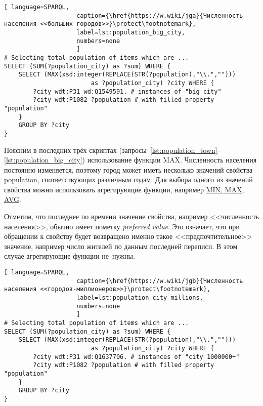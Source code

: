 \vspace{-2pt}
\begin{lstlisting}[ language=SPARQL, 
                    caption={\href{https://w.wiki/jga}{Численность населения <<больших городов>>}\protect\footnotemark},
                    label=lst:population_big_city,
                    numbers=none
                    ]
# Selecting total population of items which are ...
SELECT (SUM(?population_city) as ?sum) WHERE {                    
	SELECT (MAX(xsd:integer(REPLACE(STR(?population),"\\.",""))) 
						as ?population_city) ?city WHERE {
		?city wdt:P31 wd:Q1549591. # instances of "big city"
		?city wdt:P1082 ?population # with filled property "population"
	}
	GROUP BY ?city
}
\end{lstlisting}



\newpage
Поясним в последних трёх скриптах 
(запросы~\ref{lst:population_town}--\ref{lst:population_big_city}) 
использование функции MAX. 
Численность населения постоянно изменяется, 
поэтому город может иметь несколько значений 
свойства \href{https://www.wikidata.org/wiki/Property:P1082}{population}, 
соответствующих различным годам. Для выбора одного из значений свойства можно использовать агрегирующие функции, 
например \href{https://en.wikibooks.org/wiki/SPARQL/Expressions\_and\_Functions\#COUNT,\_MIN,\_MAX,\_AVG\_and\_SUM}{MIN, MAX, AVG}. 

Отметим, что последнее по времени значение свойства, например <<численность населения>>, 
обычно имеет пометку \emph{preferred value}. 
Это означает, что при обращении к свойству будет возвращено именно такое <<предпочтительное>> значение, 
например число жителей по данным последней переписи. 
В этом случае агрегирующие функции не~нужны. 

\begin{lstlisting}[ language=SPARQL, 
                    caption={\href{https://w.wiki/jgb}{Численность населения <<городов-миллионеров>>}\protect\footnotemark},
                    label=lst:population_city_millions,
                    numbers=none
                    ]
# Selecting total population of items which are ...
SELECT (SUM(?population_city) as ?sum) WHERE {
	SELECT (MAX(xsd:integer(REPLACE(STR(?population),"\\.",""))) 
						as ?population_city) ?city WHERE {
		?city wdt:P31 wd:Q1637706. # instances of "city 1000000+"
		?city wdt:P1082 ?population # with filled property "population"
	}
	GROUP BY ?city
}
\end{lstlisting}



